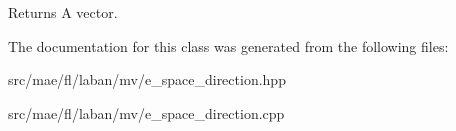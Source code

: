 \begin{DoxyReturn}{Returns}
A vector. 
\end{DoxyReturn}


The documentation for this class was generated from the following files\-:\begin{DoxyCompactItemize}
\item 
src/mae/fl/laban/mv/e\-\_\-space\-\_\-direction.\-hpp\item 
src/mae/fl/laban/mv/e\-\_\-space\-\_\-direction.\-cpp\end{DoxyCompactItemize}
